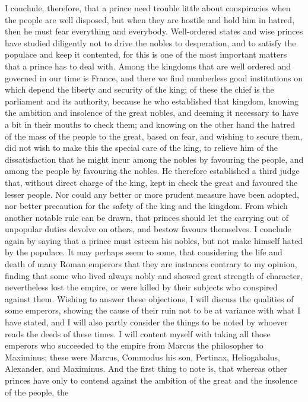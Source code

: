 \documentclass[12pt,letterpaper]{memoir}
\begin{document}
I conclude, therefore, that a prince need trouble little about
conspiracies when the people are well disposed, but when they
are hostile and hold him in hatred, then he must fear everything
and everybody. Well-ordered states and wise princes have studied
diligently not to drive the nobles to desperation, and to satisfy the
populace and keep it contented, for this is one of the most important
matters that a prince has to deal with. Among the kingdoms that are
well ordered and governed in our time is France, and there we find
numberless good institutions on which depend the liberty and security
of the king; of these the chief is the parliament and its authority,
because he who established that kingdom, knowing the ambition and
insolence of the great nobles, and deeming it necessary to have a bit
in their mouths to check them; and knowing on the other hand the hatred
of the mass of the people to the great, based on fear, and wishing to
secure them, did not wish to make this the special care of the king,
to relieve him of the dissatisfaction that he might incur among the
nobles by favouring the people, and among the people by favouring the
nobles. He therefore established a third judge that, without direct
charge of the king, kept in check the great and favoured the lesser
people. Nor could any better or more prudent measure have been adopted,
nor better precaution for the safety of the king and the kingdom. From
which another notable rule can be drawn, that princes should let the
carrying out of unpopular duties devolve on others, and bestow favours
themselves. I conclude again by saying that a prince must esteem his
nobles, but not make himself hated by the populace. It may perhaps seem
to some, that considering the life and death of many Roman emperors
that they are instances contrary to my opinion, finding that some who
lived always nobly and showed great strength of character, nevertheless
lost the empire, or were killed by their subjects who conspired against
them. Wishing to answer these objections, I will discuss the qualities
of some emperors, showing the cause of their ruin not to be at variance
with what I have stated, and I will also partly consider the things to
be noted by whoever reads the deeds of these times. I will content
myself with taking all those emperors who succeeded to the empire from
Marcus the philosopher to Maximinus; these were Marcus, Commodus his
son, Pertinax, Heliogabalus, Alexander, and Maximinus. And the first
thing to note is, that whereas other princes have only to contend
against the ambition of the great and the insolence of the people, the
\end{document}
